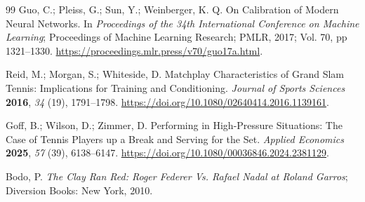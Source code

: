 \documentclass[10pt,twocolumn]{article}
\begin{document}
\begin{thebibliography}{99}
Guo, C.; Pleiss, G.; Sun, Y.; Weinberger, K. Q. On Calibration of Modern Neural Networks. In \emph{Proceedings of the 34th International Conference on Machine Learning}; Proceedings of Machine Learning Research; PMLR, 2017; Vol. 70, pp 1321--1330. \url{https://proceedings.mlr.press/v70/guo17a.html}.

Reid, M.; Morgan, S.; Whiteside, D. Matchplay Characteristics of Grand Slam Tennis: Implications for Training and Conditioning. \emph{Journal of Sports Sciences} \textbf{2016}, \emph{34} (19), 1791--1798. \url{https://doi.org/10.1080/02640414.2016.1139161}.

Goff, B.; Wilson, D.; Zimmer, D. Performing in High-Pressure Situations: The Case of Tennis Players up a Break and Serving for the Set. \emph{Applied Economics} \textbf{2025}, \emph{57} (39), 6138--6147. \url{https://doi.org/10.1080/00036846.2024.2381129}.

Bodo, P. \emph{The Clay Ran Red: Roger Federer Vs. Rafael Nadal at Roland Garros}; Diversion Books: New York, 2010.

\end{thebibliography}
\end{document}
